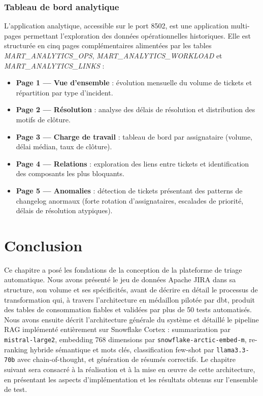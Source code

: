 \subsubsection{Tableau de bord analytique}

L'application analytique, accessible sur le port 8502, est une application multi-pages permettant l'exploration des données opérationnelles historiques. Elle est structurée en cinq pages complémentaires alimentées par les tables \textit{MART\_ANALYTICS\_OPS}, \textit{MART\_ANALYTICS\_WORKLOAD} et \textit{MART\_ANALYTICS\_LINKS} :

\begin{itemize}
    \item \textbf{Page 1 — Vue d'ensemble} : évolution mensuelle du volume de tickets et répartition par type d'incident.
    \item \textbf{Page 2 — Résolution} : analyse des délais de résolution et distribution des motifs de clôture.
    \item \textbf{Page 3 — Charge de travail} : tableau de bord par assignataire (volume, délai médian, taux de clôture).
    \item \textbf{Page 4 — Relations} : exploration des liens entre tickets et identification des composants les plus bloquants.
    \item \textbf{Page 5 — Anomalies} : détection de tickets présentant des patterns de changelog anormaux (forte rotation d'assignataires, escalades de priorité, délais de résolution atypiques).
\end{itemize}

\section{Conclusion}

Ce chapitre a posé les fondations de la conception de la plateforme de triage automatique. Nous avons présenté le jeu de données Apache JIRA dans sa structure, son volume et ses spécificités, avant de décrire en détail le processus de transformation qui, à travers l'architecture en médaillon pilotée par dbt, produit des tables de consommation fiables et validées par plus de 50 tests automatisés. Nous avons ensuite décrit l'architecture générale du système et détaillé le pipeline RAG implémenté entièrement sur Snowflake Cortex : summarization par \texttt{mistral-large2}, embedding 768 dimensions par \texttt{snowflake-arctic-embed-m}, re-ranking hybride sémantique et mots clés, classification few-shot par \texttt{llama3.3-70b} avec chain-of-thought, et génération de résumés correctifs. Le chapitre suivant sera consacré à la réalisation et à la mise en œuvre de cette architecture, en présentant les aspects d'implémentation et les résultats obtenus sur l'ensemble de test.
